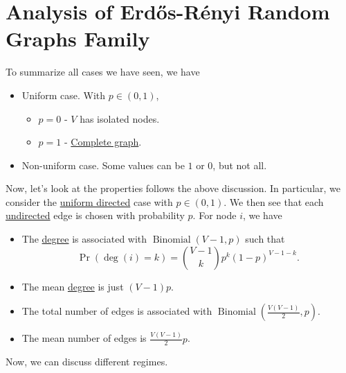 \section{Analysis of Erdős-Rényi Random Graphs Family}
\begin{prev}
	To summarize all cases we have seen, we have
	\begin{itemize}
		\item Uniform case. With \(p\in(0, 1)\),
		      \begin{itemize}
			      \item \(p = 0\) - \(V\) has isolated nodes.
			      \item \(p = 1\) - \hyperref[def:complete-graph]{Complete graph}.
		      \end{itemize}
		\item Non-uniform case. Some values can be \(1\) or \(0\), but not all.
	\end{itemize}
\end{prev}

Now, let's look at the properties follows the above discussion. In particular, we consider the \hyperref[subsec:uniform-and-directed-model]{uniform directed} case with \(p\in(0, 1)\). We then see that each \hyperref[def:undirected-graph]{undirected} edge is chosen with probability \(p\). For node \(i\), we have
\begin{itemize}
	\item The \hyperref[def:degree]{degree} is associated with
	      \(\operatorname{Binomial}(V-1, p)\) such that
	      \[
		      \Pr(\deg(i) = k) = \binom{V-1}{k}p^k (1 - p)^{V-1-k}.
	      \]
	\item The mean \hyperref[def:degree]{degree} is just \((V-1)p\).
	\item The total number of edges is associated with \(\operatorname{Binomial}\left(\frac{V(V-1)}{2}, p\right)\).
	\item The mean number of edges is \(\frac{V(V-1)}{2}p\).
\end{itemize}

Now, we can discuss different regimes.

